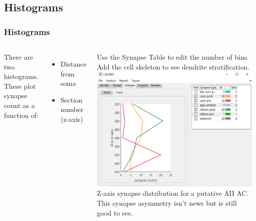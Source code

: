 \documentclass[11pt]{beamer}
\begin{document}
\subsection{Histograms}
\begin{frame}
	\frametitle{Histograms}
	\begin{columns}
			There are two histograms. These plot synapse count as a function of:
			\begin{itemize}
				\item Distance from soma
				\item Section number (z-axis)
			\end{itemize}
		Use the Synapse Table to edit the number of bins. Add the cell skeleton to see dendrite stratification.
			\includegraphics[width=\textwidth]{c6800_histZ}
		\vskip3pt
		Z-axis synapse distribution for a putative AII AC. This synapse asymmetry isn't news but is still good to see.
	\end{columns}
\end{frame}
\end{document}
